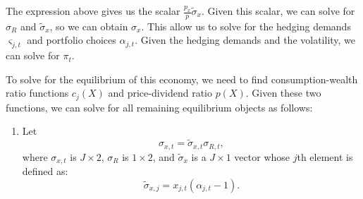 The expression above gives us the scalar $\frac{p_x}{p} \widetilde{\sigma}_x$. Given this scalar, we can solve for $\sigma_R$ and $\widetilde{\sigma}_x$, so we can obtain $\sigma_x$. This allow us to solve for the hedging demands $\varsigma_{j,t}$ and portfolio choices $\alpha_{j,t}$. Given the hedging demands and the volatility, we can solve for $\pi_t$.











To solve for the equilibrium of this economy, we need to find consumption-wealth ratio functions $ c_j(X) $ and price-dividend ratio $ p(X) $. Given these two functions, we can solve for all remaining equilibrium objects as follows:
\begin{enumerate}
	\item Let   
	\[\sigma_{x,t}=\widetilde{\sigma}_{x,t}\sigma_{R,t},\]
	where $ \sigma_{x,t} $ is $J\times2$, $ \sigma_{R} $ is $ 1\times2 $, and $ \widetilde{\sigma}_x $ is a $J\times1$ vector whose $j$th element is defined as:
	\[\widetilde{\sigma}_{x,j}=x_{j,t}(\alpha_{j,t}-1).\]

 \end{enumerate}

 